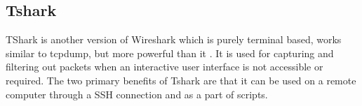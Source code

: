     \subsection{Tshark}
    TShark is another version of Wireshark which is purely terminal based, works similar to tcpdump, but more powerful than it \cite{tshark}.
    It is used for capturing and filtering out packets when an interactive user interface is not accessible or required. 
    The two primary benefits of Tshark are that it can be used  on a remote computer through a SSH connection and as a part of scripts.
    
